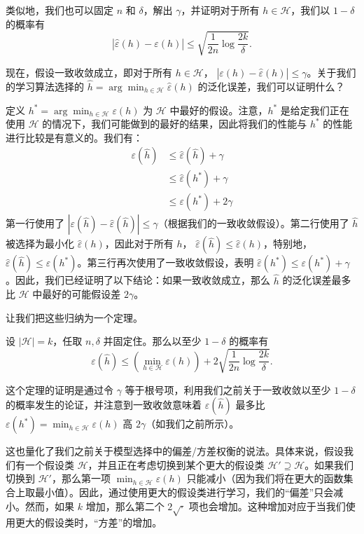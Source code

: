 类似地，我们也可以固定 $n$ 和 $\delta$，解出 $\gamma$，并证明对于所有 $h \in \mathcal{H}$，我们以 $1 - \delta$ 的概率有
\[
    |\hat{\varepsilon}(h) - \varepsilon(h)| \leq \sqrt{\frac{1}{2n} \log \frac{2k}{\delta}}.
\]

现在，假设一致收敛成立，即对于所有 $h \in \mathcal{H}$， $|\varepsilon(h) - \hat{\varepsilon}(h)| \leq \gamma$。关于我们的学习算法选择的 $\hat{h} = \arg \min_{h \in \mathcal{H}} \hat{\varepsilon}(h)$ 的泛化误差，我们可以证明什么？

定义 $h^* = \arg \min_{h \in \mathcal{H}} \varepsilon(h)$ 为 $\mathcal{H}$ 中最好的假设。注意，$h^*$ 是给定我们正在使用 $\mathcal{H}$ 的情况下，我们可能做到的最好的结果，因此将我们的性能与 $h^*$ 的性能进行比较是有意义的。我们有：
\begin{align*}
    \varepsilon(\hat{h}) 
    &\leq \hat{\varepsilon}(\hat{h}) + \gamma \\
    &\leq \hat{\varepsilon}(h^*) + \gamma \\
    &\leq \varepsilon(h^*) + 2\gamma
\end{align*}
第一行使用了 $|\varepsilon(\hat{h}) - \hat{\varepsilon}(\hat{h})| \leq \gamma$（根据我们的一致收敛假设）。第二行使用了 $\hat{h}$ 被选择为最小化 $\hat{\varepsilon}(h)$，因此对于所有 $h$， $\hat{\varepsilon}(\hat{h}) \leq \hat{\varepsilon}(h)$，特别地， $\hat{\varepsilon}(\hat{h}) \leq \hat{\varepsilon}(h^*)$。第三行再次使用了一致收敛假设，表明 $\hat{\varepsilon}(h^*) \leq \varepsilon(h^*) + \gamma$。因此，我们已经证明了以下结论：如果一致收敛成立，那么 $\hat{h}$ 的泛化误差最多比 $\mathcal{H}$ 中最好的可能假设差 $2\gamma$。

让我们把这些归纳为一个定理。

\begin{theorem*}
    设 $|\mathcal{H}| = k$，任取 $n, \delta$ 并固定住。那么以至少 $1 - \delta$ 的概率有
    \[
        \varepsilon(\hat{h}) \leq \left(\min_{h \in \mathcal{H}} \varepsilon(h)\right) + 2\sqrt{\frac{1}{2n} \log \frac{2k}{\delta}}.
    \]
\end{theorem*}

这个定理的证明是通过令 $\gamma$ 等于根号项，利用我们之前关于一致收敛以至少 $1 - \delta$ 的概率发生的论证，并注意到一致收敛意味着 $\varepsilon(\hat{h})$ 最多比 $\varepsilon(h^*) = \min_{h \in \mathcal{H}} \varepsilon(h)$ 高 $2\gamma$（如我们之前所示）。

这也量化了我们之前关于模型选择中的偏差/方差权衡的说法。具体来说，假设我们有一个假设类 $\mathcal{H}$，并且正在考虑切换到某个更大的假设类 $\mathcal{H}' \supseteq \mathcal{H}$。如果我们切换到 $\mathcal{H}'$，那么第一项 $\min_{h \in \mathcal{H}} \varepsilon(h)$ 只能减小（因为我们将在更大的函数集合上取最小值）。因此，通过使用更大的假设类进行学习，我们的“偏差”只会减小。然而，如果 $k$ 增加，那么第二个 $2\sqrt{\cdot}$ 项也会增加。这种增加对应于当我们使用更大的假设类时，“方差”的增加。

